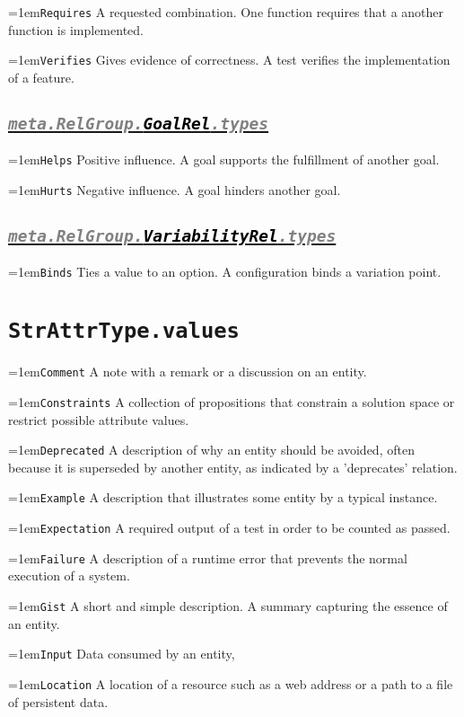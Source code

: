 \documentclass[a4paper,oneside]{article}
\newcommand\Concept[2]{\hangindent=1em\lstinline+#1+ #2}
\begin{document}
\begin{multicols}{2}
\Concept{Requires}{A requested combination. One function requires that a another function is implemented.}

\Concept{Verifies}{Gives evidence of correctness. A test verifies the implementation of a feature.}


\subsection*{\underline{\texttt{\textit{{\textcolor{gray}{meta.RelGroup.}\textcolor{black}{GoalRel}}\textcolor{gray}{.types}}}}}
\Concept{Helps}{Positive influence. A goal supports the fulfillment of another goal.}

\Concept{Hurts}{Negative influence. A goal hinders another goal.}


\subsection*{\underline{\texttt{\textit{{\textcolor{gray}{meta.RelGroup.}\textcolor{black}{VariabilityRel}}\textcolor{gray}{.types}}}}}
\Concept{Binds}{Ties a value to an option. A configuration binds a variation point.}


\newcolumn
\section*{\texttt{StrAttrType.values}}
\Concept{Comment}{A note with a remark or a discussion on an entity.}

\Concept{Constraints}{A collection of propositions that constrain a solution space or restrict possible attribute values.}

\Concept{Deprecated}{A description of why an entity should be avoided, often because it is superseded by another entity, as indicated by a 'deprecates' relation.}

\Concept{Example}{A description that illustrates some entity by a typical instance.}

\Concept{Expectation}{A required output of a test in order to be counted as passed.}

\Concept{Failure}{A description of a runtime error that prevents the normal execution of a system.}

\Concept{Gist}{A short and simple description. A summary capturing the essence of an entity.}

\Concept{Input}{Data consumed by an entity, }

\Concept{Location}{A location of a resource such as a web address or a path to a file of persistent data.}


\end{multicols}
\end{document}
